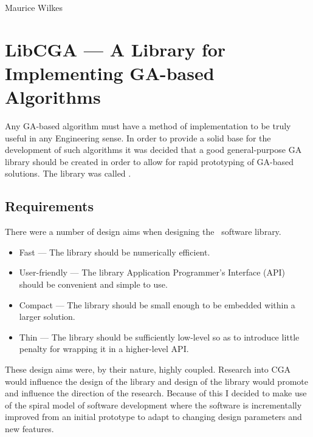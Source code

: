 \begin{savequote}[0.5\paperwidth]
%
{Maurice Wilkes}
\end{savequote}

\chapter{LibCGA --- A Library for Implementing GA-based Algorithms}

Any GA-based algorithm must have a method of implementation to be
truly useful in any Engineering sense. In order to provide a solid
base for the development of such algorithms it was decided that
a good general-purpose GA library should be created in order to 
allow for rapid prototyping of GA-based solutions. The library 
was called \libcga{}.

\section{Requirements}

There were a number of design aims when designing the \libcga\ software library.

\begin{itemize}
\item Fast --- The library should be numerically efficient.
\item User-friendly --- The library Application Programmer's Interface (API) should be convenient and simple to use.
\item Compact --- The library should be small enough to be embedded within
a larger solution.
\item Thin --- The library should be sufficiently low-level so as to introduce
little penalty for wrapping it in a higher-level API.
\end{itemize}

These design aims were, by their nature, highly coupled. Research into
CGA would influence the design of the library and design of the library would
promote and influence the direction of the research. Because of this
I decided to make use of the spiral model of software development where
the software is incrementally improved from an initial prototype to adapt
to changing design parameters and new features.

